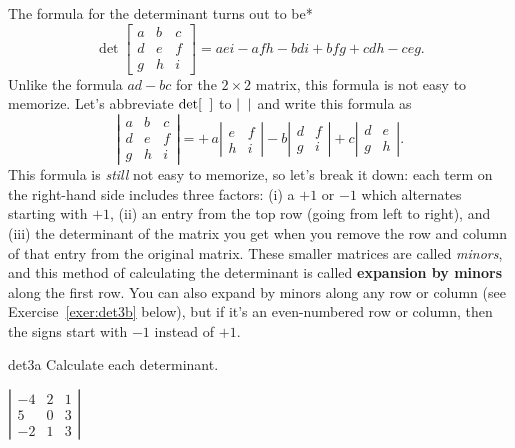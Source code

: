 \documentclass[prettycode,shellescape]{watsonbook}
\begin{document}
The formula for the determinant turns out to be*
\[
  \det \left[
    \begin{array}{ccc}
      a & b & c \\ d & e & f \\ g & h & i
    \end{array}
  \right] = 
  aei - afh - bdi + bfg + cdh - ceg. 
\]
Unlike the formula $ad - bc$ for the $2\times 2$ matrix, this formula
is not easy to memorize. Let's abbreviate $\det [ \hphantom{a} ]$ to
$| \hphantom{a}|$ and write this formula as
\[
  \left|\begin{array}{ccc} a & b & c \\ d & e & f \\ g & h & i \end{array}\right| = 
  +\hspace{2pt}a \left|\begin{array}{cc} e & f \\  h & i \end{array}\right| 
  -b \left|\begin{array}{cc} d & f \\  g & i \end{array}\right| 
  +c \left|\begin{array}{cc} d & e \\  g & h \end{array}\right|. 
\]
This formula is \textit{still} not easy to memorize, so let's break it
down: each term on the right-hand side includes three factors: (i) a $+1$ or
$-1$ which alternates starting with $+1$, (ii) an entry from the top
row (going from left to right), and (iii) the determinant of the matrix you
get when you remove the row and column of that entry from the original
matrix. These smaller matrices are called \textit{minors}, and this
method of calculating the determinant is called \textbf{expansion by
  minors} along the first row. You can also expand by minors along any
row or column (see Exercise~\ref{exer:det3b} below), but if it's an
even-numbered row or column, then the signs start with $-1$ instead of
$+1$.

\begin{exercise}{}{det3a} \setcounter{subitm}{1}
  Calculate each determinant. 

  {$\left|
      \begin{array}{ccc}
        -4 & 2 & 1 \\ 5 & 0 & 3 \\ -2 & 1 & 3
      \end{array}\right|$}
\end{exercise}
\end{document}
